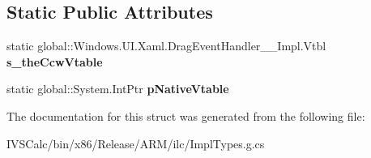 \subsection*{Static Public Attributes}
\begin{DoxyCompactItemize}
\item 
\mbox{\label{struct_windows_1_1_u_i_1_1_xaml_1_1_drag_event_handler_____impl_1_1_vtbl_ad41d406f88f3af71d53d61772f1ef557}} 
static global\+::\+Windows.\+U\+I.\+Xaml.\+Drag\+Event\+Handler\+\_\+\+\_\+\+Impl.\+Vtbl {\bfseries s\+\_\+the\+Ccw\+Vtable}
\item 
\mbox{\label{struct_windows_1_1_u_i_1_1_xaml_1_1_drag_event_handler_____impl_1_1_vtbl_abd3953ff942a3702c3a182e7112f4b01}} 
static global\+::\+System.\+Int\+Ptr {\bfseries p\+Native\+Vtable}
\end{DoxyCompactItemize}


The documentation for this struct was generated from the following file\+:\begin{DoxyCompactItemize}
\item 
I\+V\+S\+Calc/bin/x86/\+Release/\+A\+R\+M/ilc/Impl\+Types.\+g.\+cs\end{DoxyCompactItemize}
